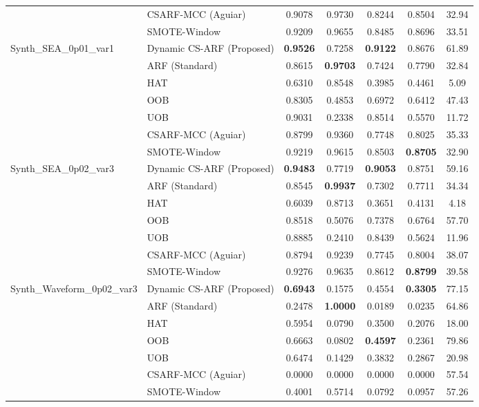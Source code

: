 \begin{longtable}{|l|l|c|c|c|c|c|}
 & CSARF-MCC (Aguiar) & 0.9078 & 0.9730 & 0.8244 & 0.8504 & 32.94 \\ \cline{2-7}
 & SMOTE-Window & 0.9209 & 0.9655 & 0.8485 & 0.8696 & 33.51 \\ \hline
\multirow{7}{*}{Synth_SEA_0p01_var1} & Dynamic CS-ARF (Proposed) & \textbf{0.9526} & 0.7258 & \textbf{0.9122} & 0.8676 & 61.89 \\ \cline{2-7}
 & ARF (Standard) & 0.8615 & \textbf{0.9703} & 0.7424 & 0.7790 & 32.84 \\ \cline{2-7}
 & HAT & 0.6310 & 0.8548 & 0.3985 & 0.4461 & 5.09 \\ \cline{2-7}
 & OOB & 0.8305 & 0.4853 & 0.6972 & 0.6412 & 47.43 \\ \cline{2-7}
 & UOB & 0.9031 & 0.2338 & 0.8514 & 0.5570 & 11.72 \\ \cline{2-7}
 & CSARF-MCC (Aguiar) & 0.8799 & 0.9360 & 0.7748 & 0.8025 & 35.33 \\ \cline{2-7}
 & SMOTE-Window & 0.9219 & 0.9615 & 0.8503 & \textbf{0.8705} & 32.90 \\ \hline
\multirow{7}{*}{Synth_SEA_0p02_var3} & Dynamic CS-ARF (Proposed) & \textbf{0.9483} & 0.7719 & \textbf{0.9053} & 0.8751 & 59.16 \\ \cline{2-7}
 & ARF (Standard) & 0.8545 & \textbf{0.9937} & 0.7302 & 0.7711 & 34.34 \\ \cline{2-7}
 & HAT & 0.6039 & 0.8713 & 0.3651 & 0.4131 & 4.18 \\ \cline{2-7}
 & OOB & 0.8518 & 0.5076 & 0.7378 & 0.6764 & 57.70 \\ \cline{2-7}
 & UOB & 0.8885 & 0.2410 & 0.8439 & 0.5624 & 11.96 \\ \cline{2-7}
 & CSARF-MCC (Aguiar) & 0.8794 & 0.9239 & 0.7745 & 0.8004 & 38.07 \\ \cline{2-7}
 & SMOTE-Window & 0.9276 & 0.9635 & 0.8612 & \textbf{0.8799} & 39.58 \\ \hline
\multirow{7}{*}{Synth_Waveform_0p02_var3} & Dynamic CS-ARF (Proposed) & \textbf{0.6943} & 0.1575 & 0.4554 & \textbf{0.3305} & 77.15 \\ \cline{2-7}
 & ARF (Standard) & 0.2478 & \textbf{1.0000} & 0.0189 & 0.0235 & 64.86 \\ \cline{2-7}
 & HAT & 0.5954 & 0.0790 & 0.3500 & 0.2076 & 18.00 \\ \cline{2-7}
 & OOB & 0.6663 & 0.0802 & \textbf{0.4597} & 0.2361 & 79.86 \\ \cline{2-7}
 & UOB & 0.6474 & 0.1429 & 0.3832 & 0.2867 & 20.98 \\ \cline{2-7}
 & CSARF-MCC (Aguiar) & 0.0000 & 0.0000 & 0.0000 & 0.0000 & 57.54 \\ \cline{2-7}
 & SMOTE-Window & 0.4001 & 0.5714 & 0.0792 & 0.0957 & 57.26 \\ \hline
\end{longtable}